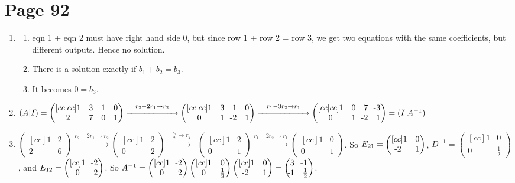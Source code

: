 \documentclass[11pt,twoside]{article}
\newcommand{\makearrow}[2]{\overset{#1}{\underset{#2}{\xrightarrow{\hspace{2cm}}}}}
\newcommand{\bpm}{\begin{pmatrix}}
\newcommand{\epm}{\end{pmatrix}}
\newcommand{\mn}{\llap{-}}
\begin{document}
\section*{Page 92}
\begin{enumerate}
  \item[7.] \begin{enumerate}
    \item eqn 1 + eqn 2 must have right hand side 0, but since row 1 + row 2 = row 3, we get two equations with the same coefficients, but different outputs. Hence no solution.
    \item There is a solution exactly if $b_1+b_2=b_3$.
    \item It becomes $0=b_3$.
  \end{enumerate}
  
  \item[22.] $(A|I) = \bpm[cc|cc]1 & 3 & 1 & 0 \\ 2 & 7 & 0 & 1\epm \makearrow{r_2 - 2r_1 \rightarrow r_2}{}\bpm[cc|cc]1 & 3 & 1 & 0 \\ 0 & 1 & \mn2 & 1\epm\makearrow{r_1-3r_2\rightarrow r_1}{} \bpm[cc|cc]1 & 0 & 7 & \mn3 \\ 0 & 1 & \mn2 & 1\epm = (I|A^{-1})$\\

  \item[26.] $\bpm[cc]1& 2\\2&6\epm\makearrow{r_2-2r_1\rightarrow r_2}{}\bpm[cc]1&2\\0&2\epm \makearrow{\frac{r_2}{2}\rightarrow r_2}{} \bpm[cc]1&2\\0&1\epm \makearrow{r_1-2r_2\rightarrow r_1}{}\bpm[cc]1&0\\0&1\epm$. So $E_{21} = \bpm[cc]1&0\\\mn2&1\epm$, $D^{-1} = \bpm[cc]1&0\\0&\frac12\epm$, and $E_{12} = \bpm[cc]1&\mn2\\0&2\epm$. So $A^{-1} = \bpm[cc]1&\mn2\\0&2\epm\bpm[cc]1&0\\0&\frac12\epm\bpm[cc]1&0\\\mn2&1\epm = \bpm 3 &\mn1 \\ \mn1 & \frac12\epm$.\\


\end{enumerate}
\end{document}
